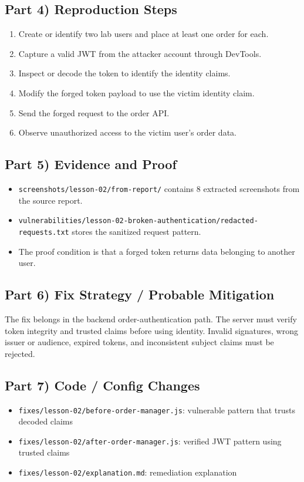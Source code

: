\documentclass[12pt]{article}
\begin{document}
\subsection*{Part 4) Reproduction Steps}
\begin{enumerate}
\item Create or identify two lab users and place at least one order for each.
\item Capture a valid JWT from the attacker account through DevTools.
\item Inspect or decode the token to identify the identity claims.
\item Modify the forged token payload to use the victim identity claim.
\item Send the forged request to the order API.
\item Observe unauthorized access to the victim user's order data.
\end{enumerate}

\subsection*{Part 5) Evidence and Proof}
\begin{itemize}
\item \texttt{screenshots/lesson-02/from-report/} contains 8 extracted screenshots from the source report.
\item \texttt{vulnerabilities/lesson-02-broken-authentication/redacted-requests.txt} stores the sanitized request pattern.
\item The proof condition is that a forged token returns data belonging to another user.
\end{itemize}

\subsection*{Part 6) Fix Strategy / Probable Mitigation}
The fix belongs in the backend order-authentication path. The server must verify token integrity and trusted claims before using identity. Invalid signatures, wrong issuer or audience, expired tokens, and inconsistent subject claims must be rejected.

\subsection*{Part 7) Code / Config Changes}
\begin{itemize}
\item \texttt{fixes/lesson-02/before-order-manager.js}: vulnerable pattern that trusts decoded claims
\item \texttt{fixes/lesson-02/after-order-manager.js}: verified JWT pattern using trusted claims
\item \texttt{fixes/lesson-02/explanation.md}: remediation explanation
\end{itemize}
\end{document}
